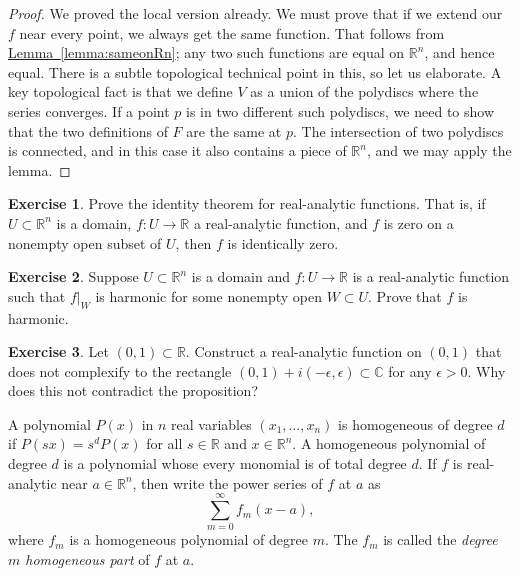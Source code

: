 \documentclass[12pt,openany]{book}
\newcommand{\C}{{\mathbb{C}}}
\newcommand{\R}{{\mathbb{R}}}
\newcommand{\myindex}[1]{#1\index{#1}}
\theoremstyle{plain}
\theoremstyle{remark}
\theoremstyle{definition}
\newenvironment{exbox}{%
    \def\FrameCommand{\vrule width 1pt \relax\hspace{10pt}}%
    \MakeFramed{\advance\hsize-\width\FrameRestore}%
}{%
    \endMakeFramed
}
\theoremstyle{exercise}
\newtheorem{exercise}{Exercise}[section]
\theoremstyle{example}
\newcommand{\lemmaref}[1]{\hyperref[#1]{Lemma~\ref*{#1}}}
\begin{document}
\begin{proof}
We proved the local version already.  We must prove that if we
extend our $f$ near every point, we always get the same function.
That follows from \lemmaref{lemma:sameonRn}; any two such functions are
equal on $\R^n$, and hence equal.  There is a subtle topological technical
point in this, so let us elaborate.  A key topological fact is that we define
$V$ as a union of the polydiscs where the series converges.  If
a point $p$ is in two different such polydiscs, we need to show that
the two definitions of $F$ are the same at $p$.  The intersection
of two polydiscs is connected, and in this case it also contains a piece
of $\R^n$, and we may apply the lemma.
\end{proof}

\begin{exbox}
\begin{exercise}
Prove the identity theorem for real-analytic functions.  That is, if $U
\subset \R^n$ is a domain, $f \colon U \to \R$ a real-analytic function, and
$f$ is zero on a nonempty open subset of $U$, then $f$ is identically zero.
\end{exercise}

\begin{exercise}
Suppose $U \subset \R^n$ is a domain and $f \colon U \to \R$ is
a real-analytic function such that $f|_W$ is harmonic for
some nonempty open $W \subset U$.
Prove that $f$ is harmonic.
\end{exercise}

\begin{exercise}
Let $(0,1) \subset \R$.  Construct a real-analytic function
on $(0,1)$ that does not complexify to the rectangle $(0,1) + i(-\epsilon,\epsilon)
\subset \C$ for any $\epsilon > 0$.  Why does this not contradict the
proposition?
\end{exercise}
\end{exbox}

\pagebreak[2]
A polynomial $P(x)$ in $n$ real variables $(x_1,\ldots,x_n)$ is homogeneous of degree $d$ if
$P(s x) = s^d P(x)$ for all $s \in \R$ and $x \in \R^n$.
A homogeneous polynomial of degree $d$ is a polynomial whose
every monomial
is of total degree $d$.
If $f$ is real-analytic near $a \in \R^n$, then
write the power series of $f$ at $a$ as
\begin{equation*}
\sum_{m=0}^{\infty} f_m(x-a) ,
\end{equation*}
where $f_m$ is a homogeneous polynomial of degree $m$.  The $f_m$ is
called the
\emph{\myindex{degree $m$ homogeneous part}} of $f$
at $a$.
\end{document}

